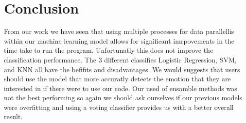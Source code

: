 \section{Conclusion}
\label{sec:conclusion}
From our work we have seen that using multiple processes
for data parallellis within our machine learning model allows for significant imrpovements in the time take to run the program.
Unfortunatly this does not improve the classification performance.
The 3 different classifies Logistic Regression,
SVM, and KNN
all have the befifits and disadvantages.
We would suggests that users should use the model that more accuratly detects
the emotion that they are interested in if there were to use our code.
Our used of ensamble methods was not the best performing so again we should
ask ourselves if our previous models were overfitting and using a voting
classifier provides us with a better overall result.
